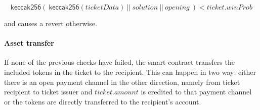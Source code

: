 $$ \mathsf{keccak256} ( \ \mathsf{keccak256}(ticketData) \ || \ solution \ || \ opening \ ) < ticket.winProb $$

and causes a revert otherwise.

\paragraph{Asset transfer}
\label{sec:tickets:redemption:assettransfer}

If none of the previous checks have failed, the smart contract transfers the included tokens in the ticket to the recipient. This can happen in two way: either there is an open payment channel in the other direction, namely from ticket recipient to ticket issuer and $ticket.amount$ is credited to that payment channel or the tokens are directly transferred to the recipient's account.
